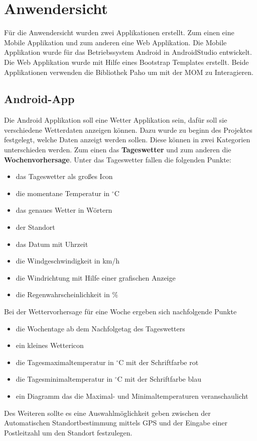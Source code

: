 \section{Anwendersicht}
Für die Anwendersicht wurden zwei Applikationen erstellt. Zum einen eine Mobile Applikation und zum anderen eine Web Applikation. Die Mobile Applikation wurde für das Betriebssystem Android in AndroidStudio entwickelt. Die Web Applikation wurde mit Hilfe eines Bootstrap Templates erstellt. Beide Applikationen verwenden die Bibliothek Paho um mit der MOM zu Interagieren.  
\subsection{Android-App}
Die Android Applikation soll eine Wetter Applikation sein, dafür soll sie verschiedene Wetterdaten anzeigen können. Dazu wurde zu beginn des Projektes festgelegt, welche Daten anzeigt werden sollen. Diese können in zwei Kategorien unterschieden werden. Zum einen das \textbf{Tageswetter} und zum anderen die \textbf{Wochenvorhersage}. Unter das Tageswetter fallen die folgenden Punkte: 
\begin{itemize}
\item das Tageswetter als großes Icon
\item die momentane Temperatur in $^\circ$C
\item das genaues Wetter in Wörtern
\item der Standort
\item das Datum mit Uhrzeit
\item die Windgeschwindigkeit in km/h
\item die Windrichtung mit Hilfe einer grafischen Anzeige
\item die Regenwahrscheinlichkeit in \%
\end{itemize}  
Bei der Wettervorhersage für eine Woche ergeben sich nachfolgende Punkte
\begin{itemize}
\item die Wochentage ab dem Nachfolgetag des Tageswetters
\item ein kleines Wettericon
\item die Tagesmaximaltemperatur in $^\circ$C mit der Schriftfarbe rot
\item die Tagesminimaltemperatur in $^\circ$C mit der Schriftfarbe blau
\item ein Diagramm das die Maximal- und Minimaltemperaturen veranschaulicht
\end{itemize}  
Des Weiteren sollte es eine Auswahlmöglichkeit geben zwischen der Automatischen Standortbestimmung mittels GPS und der Eingabe einer Postleitzahl um den Standort festzulegen.
